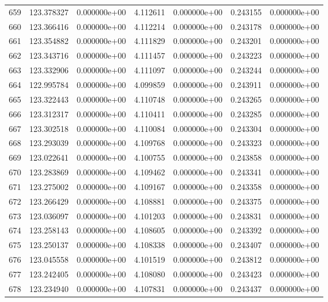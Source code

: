 \begin{tabular}{rrrrrrr}
 659 & 123.378327 &  0.000000e+00 &  4.112611 &  0.000000e+00 &    0.243155 &  0.000000e+00 \\
 660 & 123.366416 &  0.000000e+00 &  4.112214 &  0.000000e+00 &    0.243178 &  0.000000e+00 \\
 661 & 123.354882 &  0.000000e+00 &  4.111829 &  0.000000e+00 &    0.243201 &  0.000000e+00 \\
 662 & 123.343716 &  0.000000e+00 &  4.111457 &  0.000000e+00 &    0.243223 &  0.000000e+00 \\
 663 & 123.332906 &  0.000000e+00 &  4.111097 &  0.000000e+00 &    0.243244 &  0.000000e+00 \\
 664 & 122.995784 &  0.000000e+00 &  4.099859 &  0.000000e+00 &    0.243911 &  0.000000e+00 \\
 665 & 123.322443 &  0.000000e+00 &  4.110748 &  0.000000e+00 &    0.243265 &  0.000000e+00 \\
 666 & 123.312317 &  0.000000e+00 &  4.110411 &  0.000000e+00 &    0.243285 &  0.000000e+00 \\
 667 & 123.302518 &  0.000000e+00 &  4.110084 &  0.000000e+00 &    0.243304 &  0.000000e+00 \\
 668 & 123.293039 &  0.000000e+00 &  4.109768 &  0.000000e+00 &    0.243323 &  0.000000e+00 \\
 669 & 123.022641 &  0.000000e+00 &  4.100755 &  0.000000e+00 &    0.243858 &  0.000000e+00 \\
 670 & 123.283869 &  0.000000e+00 &  4.109462 &  0.000000e+00 &    0.243341 &  0.000000e+00 \\
 671 & 123.275002 &  0.000000e+00 &  4.109167 &  0.000000e+00 &    0.243358 &  0.000000e+00 \\
 672 & 123.266429 &  0.000000e+00 &  4.108881 &  0.000000e+00 &    0.243375 &  0.000000e+00 \\
 673 & 123.036097 &  0.000000e+00 &  4.101203 &  0.000000e+00 &    0.243831 &  0.000000e+00 \\
 674 & 123.258143 &  0.000000e+00 &  4.108605 &  0.000000e+00 &    0.243392 &  0.000000e+00 \\
 675 & 123.250137 &  0.000000e+00 &  4.108338 &  0.000000e+00 &    0.243407 &  0.000000e+00 \\
 676 & 123.045558 &  0.000000e+00 &  4.101519 &  0.000000e+00 &    0.243812 &  0.000000e+00 \\
 677 & 123.242405 &  0.000000e+00 &  4.108080 &  0.000000e+00 &    0.243423 &  0.000000e+00 \\
 678 & 123.234940 &  0.000000e+00 &  4.107831 &  0.000000e+00 &    0.243437 &  0.000000e+00 \\

\end{tabular}
